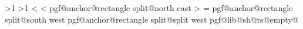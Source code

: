 {{{								\else%
									\pgfextract@process{}%
									\pgfextract@process{}%
									\ifnum\pgfmathcounter>1\relax%
										\begingroup\pgfsetcornersarced{\pgfpointorigin}%
									\fi%
									\pgfpathmoveto{%
										\pgf@lib@sh@rs@fill@topright%
										\pgf@xa=\pgf@x%
										\pgf@lib@sh@rs@fill@bottomleft%
										\pgf@x=\pgf@xa%
									}%
									\pgfpathlineto{\pgf@lib@sh@rs@fill@bottomleft}%
									\pgfpathlineto{%
										\pgf@lib@sh@rs@fill@bottomleft%
										\pgf@xa=\pgf@x%
										\pgf@lib@sh@rs@fill@topright%
										\pgf@x=\pgf@xa%
									}%
									\ifnum\pgfmathcounter>1\relax%
										\endgroup%
									\fi%
									\ifnum\pgfmathcounter<\parts%
										\begingroup\pgfsetcornersarced{\pgfpointorigin}%
									\fi%
									\pgfpathlineto{\pgf@lib@sh@rs@fill@topright}%
									\pgfpathclose%
									\ifnum\pgfmathcounter<\parts%
										\endgroup%
									\fi%
								\fi%
							\fi%
							\pgfextract@process{}%
					\repeatpgfmathloop%
				\else%
					\expandafter\let\expandafter\pgf@lib@sh@rs@fill@topright\expandafter=%
						\csname pgf@anchor@rectangle split@north east\endcsname%
					\pgfmathloop%
						\ifnum\pgfmathcounter>\parts%
						\else%
							\pgf@lib@sh@getalpha\pgf@lib@sh@rs@number{\pgfmathcounter}%
							\ifnum\pgfmathcounter=\parts%
								\expandafter\let\expandafter\pgf@lib@sh@rs@fill@bottomleft\expandafter=%
									\csname pgf@anchor@rectangle split@south west\endcsname%
							\else%
								\expandafter\let\expandafter\pgf@lib@sh@rs@fill@bottomleft\expandafter=%
									\csname pgf@anchor@rectangle split@\pgf@lib@sh@rs@number\space split west\endcsname%
							\fi%
							\expandafter\ifx\csname pgf@lib@sh@rs@empty@\pgf@lib@sh@rs@number\endcsname\pgfutil@empty%
							\else%
}}}
